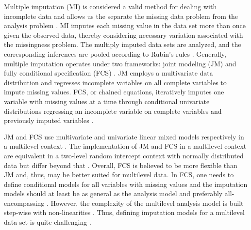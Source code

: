 \documentclass[10pt, a4paper, titlepage]{article}
\begin{document}
Multiple imputation (MI) is considered a valid method for dealing with incomplete data and allows us the separate the missing data problem from the analysis problem \citep{mistlerComparisonJointModel2017, buurenFlexibleImputationMissing2018, enders2017, burgette2010, austin2021, audigier2018, vanbuuren2007, grund2021, hughes2014}. MI imputes each missing value in the data set more than once given the observed data, thereby considering necessary variation associated with the missingness problem. The multiply imputed data sets are analyzed, and the corresponding inferences are pooled according to Rubin's rules \citep{buurenFlexibleImputationMissing2018, austin2021, rubin1987, carpenter2013}.
Generally, multiple imputation operates under two frameworks: joint modeling (JM) and fully conditional specification (FCS) \citep{mistlerComparisonJointModel2017, buurenFlexibleImputationMissing2018, enders2018, enders2018a, hughes2014}. JM employs a multivariate data distribution and regresses incomplete variables on all complete variables to impute missing values. FCS, or chained equations, iteratively imputes one variable with missing values at a time through conditional univariate distributions regressing an incomplete variable on complete variables and previously imputed variables \citep{mistlerComparisonJointModel2017, buurenFlexibleImputationMissing2018, enders2016, enders2018, enders2018a, hughes2014, grund2018a}.

JM and FCS use multivariate and univariate linear mixed models respectively in a multilevel context \citep{mistlerComparisonJointModel2017, enders2018}. The implementation of JM and FCS in a multilevel context are equivalent in a two-level random intercept context with normally distributed data but differ beyond that \citep{enders2016, enders2018a}. Overall, FCS is believed to be more flexible than JM \citep{audigier2018, burgette2010, vanbuuren2007, grund2018a} and, thus, may be better suited for multilevel data. In FCS, one needs to define conditional models for all variables with missing values \citep{mistlerComparisonJointModel2017, buurenFlexibleImputationMissing2018, enders2018, enders2018a, enders2016, hughes2014, grund2018a} and the imputation models should at least be as general as the analysis model and preferably all-encompassing \citep{grund2018}. However, the complexity of the multilevel analysis model is built step-wise with non-linearities \citep{hox2017, hox2011}. Thus, defining imputation models for a multilevel data set is quite challenging \citep{buurenFlexibleImputationMissing2018, burgette2010, hox2011}.
\end{document}
